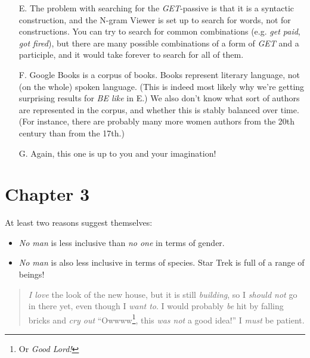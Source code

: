 \begin{itemize}
    \item[E.] The problem with searching for the \emph{GET}-passive is that it is a syntactic construction, and the N-gram Viewer is set up to search for words, not for constructions. You can try to search for common combinations (e.g. \emph{get paid}, \emph{got fired}), but there are many possible combinations of a form of \emph{GET} and a participle, and it would take forever to search for all of them.
    \item[F.] Google Books is a corpus of books. Books represent literary language, not (on the whole) spoken language. (This is indeed most likely why we're getting surprising results for \textit{BE like} in E.) We also don't know what sort of authors are represented in the corpus, and whether this is stably balanced over time. (For instance, there are probably many more women authors from the 20th century than from the 17th.)
    \item[G.] Again, this one is up to you and your imagination!
\end{itemize}

\section*{Chapter 3}
\noindent\textbf{}

\noindent At least two reasons suggest themselves:

\begin{itemize}
    \item \textit{No man} is less inclusive than \textit{no one} in terms of gender.
    \item \textit{No man} is also less inclusive in terms of species. Star Trek is full of a range of beings!
\end{itemize}

\noindent\textbf{}
\begin{quote}
    \emph{I love} the look of the new house, but it is still \emph{building}, so I \emph{should not} go in there yet, even though I \emph{want to}. I would probably \emph{be} hit by falling bricks and \emph{cry out} ``Owwww\footnote{Or \textit{Good Lord!}}, this \emph{was not} a good idea!'' I \emph{must} be patient.
\end{quote}


\noindent\textbf{}

